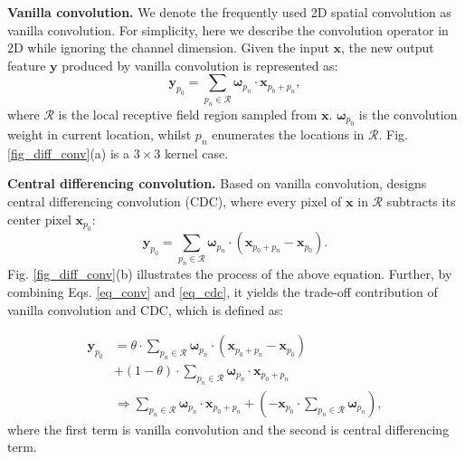 \documentclass[lettersize,journal]{IEEEtran}
\begin{document}
\textbf{Vanilla convolution.} We denote the frequently used 2D spatial convolution as vanilla convolution. %
For simplicity, here we describe the convolution operator in 2D while ignoring the channel dimension. 
Given the input $\boldsymbol x$, the new output feature $\boldsymbol y$ produced by vanilla convolution is represented as: 
\begin{equation}\label{eq_conv}
\boldsymbol y_{p_0}=\sum_{p_n\in \mathcal{R}}{\boldsymbol \omega_{p_n} \cdot \boldsymbol x_{p_0 + p_n}},
\end{equation}
where $\mathcal{R}$ is the local receptive field region sampled from $\boldsymbol x$. $\boldsymbol \omega_{p_0}$ is the convolution weight in current location, whilst $p_n$ enumerates the locations in $\mathcal{R}$. Fig. \ref{fig_diff_conv}(a) is a $3\times 3$ kernel case. 

\textbf{Central differencing convolution.} Based on vanilla convolution, \cite{yu2020searching} designs central differencing convolution (CDC), where every pixel of $\boldsymbol x$ in $\mathcal{R}$ subtracts its center pixel $\boldsymbol x_{p_0}$:
\begin{equation}\label{eq_cdc}
\boldsymbol y_{p_0}=\sum_{p_n\in \mathcal{R}}{\boldsymbol \omega_{p_n} \cdot  \left( \boldsymbol x_{p_0 + p_n} - \boldsymbol x_{p_0} \right )}.
\end{equation}
Fig. \ref{fig_diff_conv}(b) illustrates the process of the above equation. Further, by combining Eqs. \ref{eq_conv} and \ref{eq_cdc}, it yields the trade-off contribution of vanilla convolution and CDC, which is defined as: 

\begin{equation}\label{eq_cdc_final}
\begin{split}
\boldsymbol y_{p_0}&=\theta \cdot \sum_{p_n\in \mathcal{R}}{\boldsymbol \omega_{p_n} \cdot  \left( \boldsymbol x_{p_0 + p_n} - \boldsymbol x_{p_0} \right )}\\
&+ \left( 1 - \theta \right ) \cdot \sum_{p_n\in \mathcal{R}}{\boldsymbol \omega_{p_n} \cdot  \boldsymbol x_{p_0 + p_n}}\\
&\Rightarrow \sum_{p_n\in \mathcal{R}}{\boldsymbol \omega_{p_n} \cdot \boldsymbol x_{p_0 + p_n}} + ( -\boldsymbol x_{p_0} \cdot \sum_{p_n\in \mathcal{R}}{\boldsymbol \omega_{p_n}} ), 
\end{split}
\end{equation}
where the first term is vanilla convolution and the second is central differencing term. 
\end{document}
